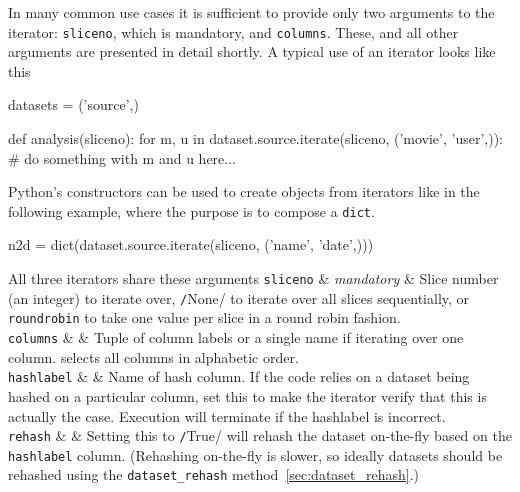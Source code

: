 In many common use cases it is sufficient to provide only two
arguments to the iterator: \texttt{sliceno}, which is mandatory,
and \texttt{columns}.  These, and all other arguments are presented in
detail shortly. A typical use of an iterator looks like this
\begin{python}
datasets = ('source',)

def analysis(sliceno):
    for m, u in dataset.source.iterate(sliceno, ('movie', 'user',)):
        # do something with m and u here...
\end{python}
Python's constructors can be used to create objects from iterators
like in the following example, where the purpose is to compose
a \texttt{dict}.
\begin{python}
n2d = dict(dataset.source.iterate(sliceno, ('name', 'date',)))
\end{python}

All three iterators share these arguments
\starttable
  \RP \texttt{sliceno} & \textsl{mandatory} & Slice number (an
  integer) to iterate over, \texttt/None/ to iterate over
  all slices sequentially, or \texttt{roundrobin} to take one value
  per slice in a round robin fashion. \\[1ex]

  \RP \texttt{columns} & \pyNone & Tuple of column labels or a single
  name if iterating over one column.  \pyNone selects all columns in
  alphabetic order.\\[1ex]

  \RP \texttt{hashlabel} & \pyNone & Name of hash column.  If the code
  relies on a dataset being hashed on a particular column, set this to
  make the iterator verify that this is actually the case.  Execution
  will terminate if the hashlabel is incorrect.\\[1ex]

  \RP \texttt{rehash} & \pyFalse & Setting this
  to \texttt/True/ will rehash the dataset on-the-fly
  based on the \texttt{hashlabel} column.  (Rehashing on-the-fly is
  slower, so ideally datasets should be rehashed using
  the \texttt{dataset\_rehash}
  method~\ref{sec:dataset_rehash}.)\\[1ex]
  
  

